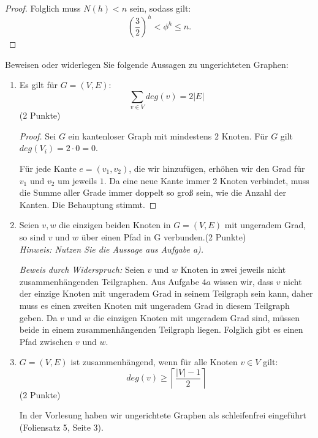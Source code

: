 \documentclass[ngerman,landscape,twocolumn]{adtexsheet}
\begin{document}
\begin{question}
\begin{enumerate}
\begin{proof}
            Folglich muss $N(h) < n$ sein, sodass gilt:
            \[
            \left(\frac{3}{2}\right)^h < \phi^h \leq n
            .\]
        \end{proof}
    \end{enumerate}
\end{question}

\begin{question}
    Beweisen oder widerlegen Sie folgende Aussagen zu ungerichteten Graphen:
    \begin{enumerate}
        \item Es gilt für $G = (V, E)$:
\[
\sum_{v \in V} deg(v) = 2|E|
\]
            (2 Punkte)
            \begin{proof}
                Sei $G$ ein kantenloser Graph mit mindestens $2$ Knoten. Für $G$ gilt $deg(V_i) = 2 \cdot 0 = 0$.
                
                Für jede Kante $e = (v_1, v_2)$, die wir hinzufügen, erhöhen wir den Grad für $v_1$ und $v_2$ um jeweils $1$.
                Da eine neue Kante immer $2$ Knoten verbindet, muss die Summe aller Grade immer doppelt so groß sein, wie die Anzahl der Kanten. Die Behauptung stimmt.
            \end{proof}
           
            
        \item Seien $v, w$ die einzigen beiden Knoten in $G = (V, E)$ mit ungeradem Grad, so sind $v$ und $w$ über einen Pfad in G verbunden.(2 Punkte) \\
            \emph{Hinweis: Nutzen Sie die Aussage aus Aufgabe a).}


            \emph{Beweis durch Widerspruch:}
            Seien $v$ und $w$ Knoten in zwei jeweils nicht zusammenhängenden Teilgraphen. Aus Aufgabe $4a$ wissen wir, dass $v$ nicht der einzige Knoten mit ungeradem Grad in seinem Teilgraph sein kann, daher muss es einen zweiten Knoten mit ungeradem Grad in diesem Teilgraph geben. Da $v$ und $w$ die einzigen Knoten mit ungeradem Grad sind, müssen beide in einem zusammenhängenden Teilgraph liegen. Folglich gibt es einen Pfad zwischen $v$ und $w$. \hfill\qedsymbol

\newpage
        \item $G = (V, E)$ ist zusammenhängend, wenn für alle Knoten $v \in V$ gilt:
\[
deg(v) \geq \left\lceil\frac{|V|-1}{2}\right\rceil
\]
            (2 Punkte)
            
            In der Vorlesung haben wir ungerichtete Graphen als schleifenfrei eingeführt (Foliensatz 5, Seite 3).
            

\end{enumerate}
\end{question}
\end{document}
